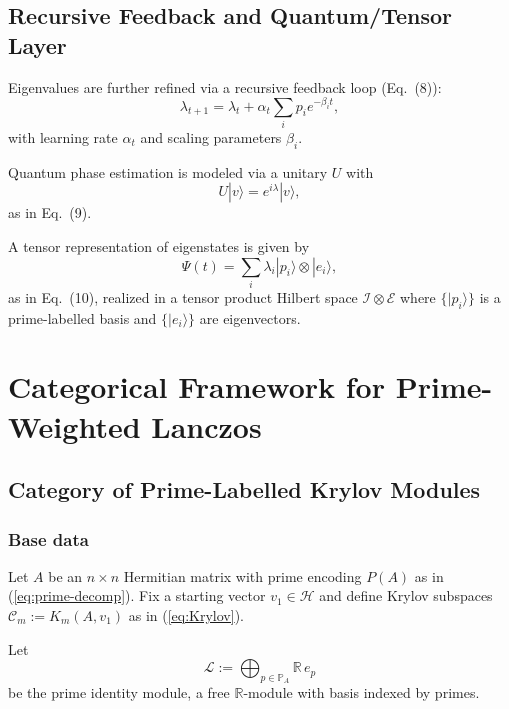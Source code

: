 \documentclass[11pt]{article}
\begin{document}
\subsection{Recursive Feedback and Quantum/Tensor Layer}

Eigenvalues are further refined via a recursive feedback loop (Eq.~(8)):
\begin{equation}
\lambda_{t+1} = \lambda_t + \alpha_t \sum_i p_i e^{-\beta_i t},
\label{eq:feedback}
\end{equation}
with learning rate $\alpha_t$ and scaling parameters
$\beta_i$.\cite{PrimeEigenSolvers}

Quantum phase estimation is modeled via a unitary $U$ with
\begin{equation}
U|v\rangle = e^{i\lambda} |v\rangle,
\label{eq:QPE-unitary}
\end{equation}
as in Eq.~(9).\cite{PrimeEigenSolvers}

A tensor representation of eigenstates is given by
\begin{equation}
\Psi(t) = \sum_i \lambda_i |p_i\rangle \otimes |e_i\rangle,
\label{eq:tensor-state}
\end{equation}
as in Eq.~(10), realized in a tensor product Hilbert space
$\mathcal{I}\otimes\mathcal{E}$ where $\{|p_i\rangle\}$ is a
prime-labelled basis and $\{|e_i\rangle\}$ are eigenvectors.\cite{PrimeEigenSolvers}

\section{Categorical Framework for Prime-Weighted Lanczos}

\subsection{Category of Prime-Labelled Krylov Modules}

\subsubsection*{Base data}

Let $A$ be an $n\times n$ Hermitian matrix with prime encoding
$P(A)$ as in (\ref{eq:prime-decomp}).\cite{PrimeEigenSolvers} Fix a
starting vector $v_1 \in \mathcal{H}$ and define Krylov subspaces
$\mathcal{C}_m := K_m(A,v_1)$ as in (\ref{eq:Krylov}).\cite{PrimeEigenSolvers}

Let
\[
\mathcal{L} := \bigoplus_{p\in\mathbb{P}_A} \mathbb{R}\, e_p
\]
be the prime identity module, a free $\mathbb{R}$-module with basis
indexed by primes.\cite{PrimeEigenSolvers,CategoryModules}
\end{document}
